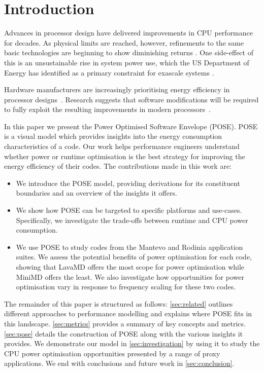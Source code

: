 \section{Introduction} \noindent
Advances in processor design have delivered improvements in CPU performance for decades. As physical limits are reached, however, refinements to the same basic technologies are beginning to show diminishing returns \cite{esmaeilzadeh:2011aa}. One side-effect of this is an unsustainable rise in system power use, which the US Department of Energy has identified as a primary constraint for exascale systems \cite{shalf:2011aa}.

Hardware manufacturers are increasingly prioritising energy efficiency in processor designs~\cite{kurd:2014aa}. 
Research suggests that software modifications will be required to fully exploit the resulting improvements in modern processors~\cite{shao:2013aa}.

In this paper we present the Power Optimised Software Envelope (POSE).
POSE is a visual model which provides insights into the energy consumption characteristics of a code.
Our work helps performance engineers understand whether power or runtime optimisation is the best strategy for improving the energy efficiency of their codes.
The contributions made in this work are:
\begin{itemize}
  \item We introduce the POSE model, providing derivations for its constituent boundaries and an overview of the insights it offers.
  \item We show how POSE can be targeted to specific platforms and use-cases. 
        Specifically, we investigate the trade-offs between runtime and CPU power consumption.
  \item We use POSE to study codes from the Mantevo and Rodinia application suites.
        We assess the potential benefits of power optimisation for each code, showing that LavaMD offers the most scope for power optimisation while MiniMD offers the least.
        We also investigate how opportunities for power optimisation vary in response to frequency scaling for these two codes.
\end{itemize}

The remainder of this paper is structured as follows: \autoref{sec:related} outlines different approaches to performance modelling and explains where POSE fits in this landscape.
\autoref{sec:metrics} provides a summary of key concepts and metrics.
\autoref{sec:pose} details the construction of POSE along with the various insights it provides.
We demonstrate our model in \autoref{sec:investigation} by using it to study the CPU power optimisation opportunities presented by a range of proxy applications. 
We end with conclusions and future work in \autoref{sec:conclusion}.
